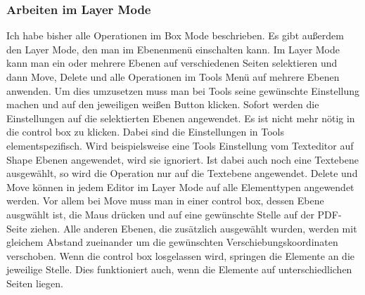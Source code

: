 \subsubsection{Arbeiten im Layer Mode}
Ich habe bisher alle Operationen im Box Mode beschrieben. Es gibt außerdem den Layer Mode, den man im Ebenenmenü einschalten kann. Im Layer Mode kann man ein oder mehrere Ebenen auf verschiedenen Seiten selektieren und dann Move, Delete und alle Operationen im Tools Menü auf mehrere Ebenen anwenden. Um dies umzusetzen muss man bei Tools seine gewünschte Einstellung machen und auf den jeweiligen weißen Button klicken. Sofort werden die Einstellungen auf die selektierten Ebenen angewendet. Es ist nicht mehr nötig in die control box zu klicken. Dabei sind die Einstellungen in Tools elementspezifisch. Wird beispielsweise eine Tools Einstellung vom Texteditor auf Shape Ebenen angewendet, wird sie ignoriert. Ist dabei auch noch eine Textebene ausgewählt, so wird die Operation nur auf die Textebene angewendet. Delete und Move können in jedem Editor im Layer Mode auf alle Elementtypen angewendet werden. Vor allem bei Move muss man in einer control box, dessen Ebene ausgwählt ist, die Maus drücken und auf eine gewünschte Stelle auf der PDF-Seite ziehen. Alle anderen Ebenen, die zusätzlich ausgewählt wurden, werden mit gleichem Abstand zueinander um die gewünschten Verschiebungskoordinaten verschoben. Wenn die control box losgelassen wird, springen die Elemente an die jeweilige Stelle. Dies funktioniert auch, wenn die Elemente auf unterschiedlichen Seiten liegen. 